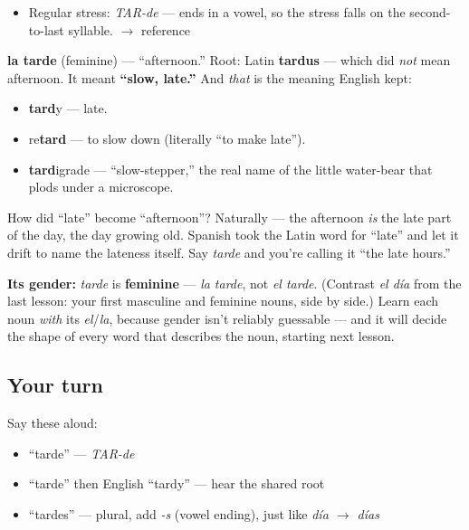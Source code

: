 \begin{sounds}
\begin{itemize}
\raggedright
  \item Regular stress: \emph{TAR-de} — ends in a vowel, so the stress falls on the second-to-last syllable. $\to$ reference
\end{itemize}

\textbf{la tarde} (feminine) — \textquotedblleft{}afternoon.\textquotedblright{} Root: Latin \textbf{tardus} — which did \emph{not} mean afternoon. It meant \textbf{\textquotedblleft{}slow, late.\textquotedblright{}} And \emph{that} is the meaning English kept:

\begin{itemize}
\raggedright
  \item \textbf{tard}y — late.
  \item re\textbf{tard} — to slow down (literally \textquotedblleft{}to make late\textquotedblright{}).
  \item \textbf{tard}igrade — \textquotedblleft{}slow-stepper,\textquotedblright{} the real name of the little water-bear that plods under a microscope.
\end{itemize}

How did \textquotedblleft{}late\textquotedblright{} become \textquotedblleft{}afternoon\textquotedblright{}? Naturally — the afternoon \emph{is} the late part of the day, the day growing old. Spanish took the Latin word for \textquotedblleft{}late\textquotedblright{} and let it drift to name the lateness itself. Say \emph{tarde} and you're calling it \textquotedblleft{}the late hours.\textquotedblright{}

\textbf{Its gender:} \emph{tarde} is \textbf{feminine} — \emph{la tarde}, not \emph{el tarde}. (Contrast \emph{el día} from the last lesson: your first masculine and feminine nouns, side by side.) Learn each noun \emph{with} its \emph{el}/\emph{la}, because gender isn't reliably guessable — and it will decide the shape of every word that describes the noun, starting next lesson.
\end{sounds}

\subsection*{Your turn}
Say these aloud:

\begin{itemize}
\raggedright
  \item \textquotedblleft{}tarde\textquotedblright{} — \emph{TAR-de}
  \item \textquotedblleft{}tarde\textquotedblright{} then English \textquotedblleft{}tardy\textquotedblright{} — hear the shared root
  \item \textquotedblleft{}tardes\textquotedblright{} — plural, add \emph{-s} (vowel ending), just like \emph{día $\to$ días}
\end{itemize}

